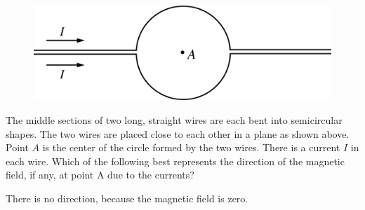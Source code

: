 \begin{figure}[H]
\centering
\includegraphics[scale=0.3]{images/img-008-014.png}
\end{figure}

\begin{questions}\setcounter{question}{19}\question
The middle sections of two long, straight wires are each bent into semicircular shapes. The two wires are placed close to each other in a plane as shown above. Point $A$ is the center of the circle formed by the two wires. There is a current $I$ in each wire. Which of the following best represents the direction of the magnetic field, if any, at point A due to the currents?

\begin{choices}
\choice {}
\choice {}
\choice {}
\choice {}
\choice There is no direction, because the magnetic
field is zero.
\end{choices}\end{questions}
